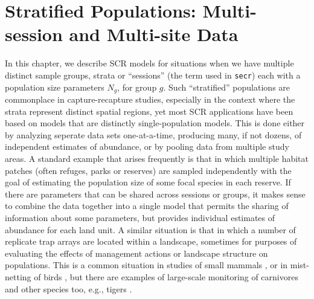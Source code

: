 \chapter{Stratified Populations:
Multi-session and Multi-site Data}
\label{chapt.hscr}

\vspace{0.3cm}


In this chapter, we describe SCR models for situations when we have
multiple distinct sample groups, strata or ``sessions'' (the term used
in \mbox{\tt secr}) each with a population size parameters $N_{g}$, for
group $g$.
Such ``stratified'' populations are commonplace in capture-recapture
studies, especially in the context where the strata represent
distinct spatial regions, yet most SCR applications have been based
 on models that are distinctly single-population models. This is done
 either by analyzing seperate data sets one-at-a-time, producing many,
 if not dozens, of independent estimates of abundance, or by pooling
 data from multiple study areas.  A standard example that arises
frequently is that in which multiple habitat patches (often refuges,
parks or reserves) are sampled independently with the goal of
estimating the population size of some focal species in each
reserve. If there are parameters that can be shared across sessions or
groups, it makes sense to 
combine the data together into a single model that permits the
sharing of information about some parameters, but provides individual
estimates of abundance for each land unit.  
A similar situation is that in which a number of replicate trap arrays
are located within a landscape, sometimes for purposes of evaluating
the effects of management actions or landscape structure on
populations. This is a common situation in studies of small mammals
\citep{converse_etal:2006jwm, converse_etal:2006ea,
  converse_royle:2012}, or in mist-netting of birds
\citep{desante_etal:1995}, but there are examples of large-scale
monitoring of carnivores and other species too, e.g., tigers
\citep{jhala_etal:2011}.

